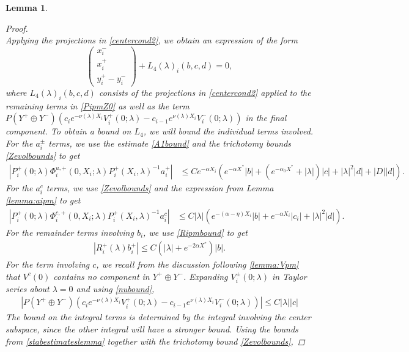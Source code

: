 \documentclass[10pt,reqno]{amsart}
\theoremstyle{plain}
\newtheorem{lemma}[theorem]{Lemma}
\theoremstyle{definition}
\theoremstyle{remark}
\numberwithin{theorem}{section}
\numberwithin{equation}{section}
\begin{document}
\begin{lemma}
\begin{proof}
\begin{equation}
\end{equation}
Applying the projections in \eqref{centercond2}, we obtain an expression of the form
\begin{equation}\label{projxy}
\begin{pmatrix}x_i^- \\ x_i^+ \\ 
y_i^+ - y_i^- \end{pmatrix} 
+ L_4(\lambda)_i(b, c, d) = 0,
\end{equation}
where $L_4(\lambda)_i(b, c, d)$ consists of the projections in \cref{centercond2} applied to the remaining terms in \cref{PipmZ0} as well as the term $P(Y^+ \oplus Y^-) ( c_i e^{-\nu(\lambda)X_i}V_i^+(0; \lambda) - c_{i-1} e^{\nu(\lambda)X_i} V_i^-(0; \lambda) )$ in the final component. To obtain a bound on $L_4$, we will bound the individual terms involved. For the $a_i^\pm$ terms, we use the estimate \cref{A1bound} and the trichotomy bounds \cref{Zevolbounds} to get
\begin{align*}
|P_i^+(0; \lambda) \Phi_i^{u,+}(0, X_i; \lambda) P_i^+(X_i, \lambda)^{-1} a_i^+| 
&\leq C e^{-\alpha X_i} \left( e^{-\alpha X^*} |b| + (e^{-\alpha_0 X^*} + |\lambda|)|c| + |\lambda|^2 |d| + |D||d| \right).
\end{align*}
For the $a_i^c$ terms, we use \cref{Zevolbounds} and the expression from Lemma \ref{lemma:aipm} to get
\begin{align*}
| P_i^+(0; \lambda) \Phi_i^{c,+}(0, X_i; \lambda) P_i^+(X_i, \lambda)^{-1} a_i^c | &\leq C |\lambda| \left( e^{-(\alpha-\eta) X_i} |b| + e^{-\alpha X_i} |c_i| +|\lambda|^2 |d| \right).
\end{align*}
For the remainder terms involving $b_i$, we use \cref{Ripmbound} to get
\begin{align*}
|R_i^+(\lambda) b_i^+|\leq C \left(|\lambda| + e^{-2 \alpha X^*}\right)|b|.
\end{align*}
For the term involving $c$, we recall from the discussion following \cref{lemma:Vpm} that $V^c(0)$ contains no component in $Y^+ \oplus Y^-$. Expanding $V_i^\pm(0; \lambda)$ in Taylor series about $\lambda = 0$ and using \cref{nubound},
\begin{align*}
| P(Y^+ \oplus Y^-) ( c_i e^{-\nu(\lambda)X_i}V_i^+(0; \lambda) - c_{i-1} e^{\nu(\lambda)X_i} V_i^-(0; \lambda) ) | \leq C |\lambda| |c|
\end{align*}
The bound on the integral terms is determined by the integral involving the center subspace, since the other integral will have a stronger bound. Using the bounds from \cref{stabestimateslemma} together with the trichotomy bound \cref{Zevolbounds}, 

\end{proof}
\end{lemma}
\end{document}
